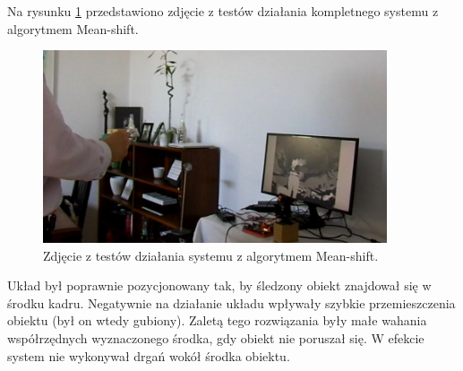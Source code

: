 \newpage
Na rysunku \ref{fig:meanshift_servo} przedstawiono zdjęcie z testów działania kompletnego systemu z algorytmem Mean-shift. 

\begin{figure}[h]
	\centering
	\includegraphics[width=4in]{meanshift_servo.jpg}
	\caption{Zdjęcie z testów działania systemu z algorytmem Mean-shift.}
	\label{fig:meanshift_servo}
\end{figure}

Układ był poprawnie pozycjonowany tak, by śledzony obiekt znajdował się w środku kadru. Negatywnie na działanie układu wpływały szybkie przemieszczenia obiektu (był on wtedy gubiony). Zaletą tego rozwiązania były małe wahania współrzędnych wyznaczonego środka, gdy obiekt nie poruszał się. W efekcie system nie wykonywał drgań wokół środka obiektu.